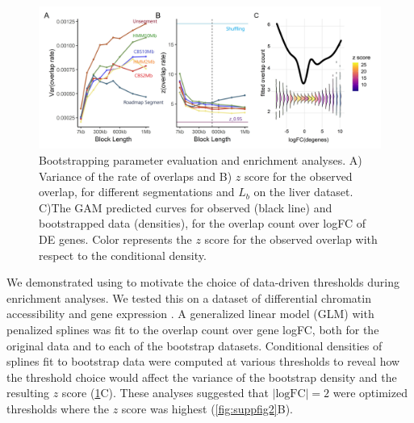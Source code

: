 \begin{figure}[hbtp]
\centering%
\setlength{\abovecaptionskip}{-0.1cm}
\setlength{\belowcaptionskip}{-0.1cm}
\includegraphics[scale=0.06]{Figures/fig2_3.jpeg}
\caption{
  Bootstrapping parameter evaluation and enrichment analyses. 
  A) Variance of the rate of overlaps and
  B) $z$ score for the observed overlap,
  for different segmentations and $L_b$ on the liver 
  dataset.
   C)The GAM predicted curves for observed (black line) and
  bootstrapped data (densities),
  for the overlap count over logFC of DE genes.
  Color represents the $z$ score for the observed overlap
  with respect to the conditional density.
}
\label{fig:result}
\vspace{-0.7cm}
\end{figure}


We demonstrated using \bootranges to motivate the choice of data-driven thresholds 
during enrichment analyses. We tested this on a dataset of differential chromatin accessibility and gene expression 
\citep{alasoo2018shared,lee2020fluent}.
A generalized linear model (GLM) with penalized splines was
fit to the overlap count over gene logFC, both for the original
data and to each of the bootstrap datasets.
Conditional densities of splines fit to bootstrap data
were computed at various thresholds to reveal how
the threshold choice would affect the
variance of the bootstrap density and the resulting $z$ score
(\cref{fig:result}C).
These analyses suggested that $|\textrm{logFC}| = 2$
were optimized thresholds where the $z$ score was highest
(\cref{fig:suppfig2}B).

